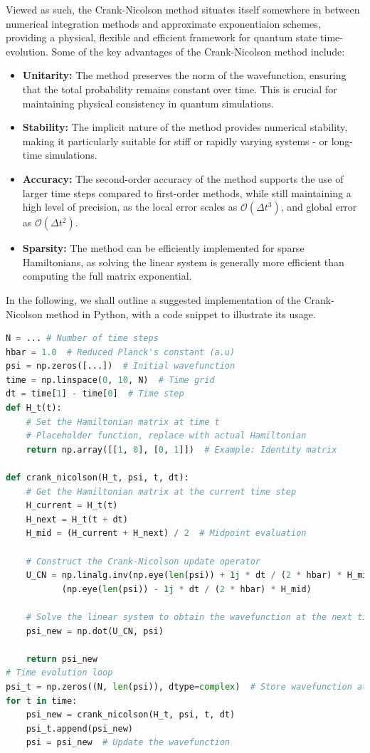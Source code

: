 \documentclass{subfiles}
\begin{document}
Viewed as such, the Crank-Nicolson method situates itself somewhere in between numerical integration methods and approximate exponentiaion schemes, providing a physical, flexible and efficient framework for quantum state time-evolution. Some of the key advantages of the Crank-Nicolson method include:
\begin{itemize}
    \item \textbf{Unitarity:} The method preserves the norm of the wavefunction, ensuring that the total probability remains constant over time. This is crucial for maintaining physical consistency in quantum simulations.
    \item \textbf{Stability:} The implicit nature of the method provides numerical stability, making it particularly suitable for stiff or rapidly varying systems - or long-time simulations.
    \item \textbf{Accuracy:} The second-order accuracy of the method supports the use of larger time steps compared to first-order methods, while still maintaining a high level of precision, as the local error scales as $\mathcal{O}(\Delta t^3)$, and global error as $\mathcal{O}(\Delta t^2)$.
    \item \textbf{Sparsity:} The method can be efficiently implemented for sparse Hamiltonians, as solving the linear system is generally more efficient than computing the full matrix exponential.
\end{itemize}
In the following, we shall outline a suggested implementation of the Crank-Nicolson method in Python, with a code snippet to illustrate its usage.
\begin{lstlisting}[language=Python]
N = ... # Number of time steps
hbar = 1.0  # Reduced Planck's constant (a.u)
psi = np.zeros([...])  # Initial wavefunction
time = np.linspace(0, 10, N)  # Time grid
dt = time[1] - time[0]  # Time step
def H_t(t):
    # Set the Hamiltonian matrix at time t
    # Placeholder function, replace with actual Hamiltonian
    return np.array([[1, 0], [0, 1]])  # Example: Identity matrix

def crank_nicolson(H_t, psi, t, dt):
    # Get the Hamiltonian matrix at the current time step
    H_current = H_t(t)
    H_next = H_t(t + dt)
    H_mid = (H_current + H_next) / 2  # Midpoint evaluation
    
    # Construct the Crank-Nicolson update operator
    U_CN = np.linalg.inv(np.eye(len(psi)) + 1j * dt / (2 * hbar) * H_mid) @ \
           (np.eye(len(psi)) - 1j * dt / (2 * hbar) * H_mid)
    
    # Solve the linear system to obtain the wavefunction at the next time step
    psi_new = np.dot(U_CN, psi)
    
    return psi_new
# Time evolution loop
psi_t = np.zeros((N, len(psi)), dtype=complex)  # Store wavefunction at each time step
for t in time:
    psi_new = crank_nicolson(H_t, psi, t, dt)
    psi_t.append(psi_new)
    psi = psi_new  # Update the wavefunction
\end{lstlisting}
\end{document}
